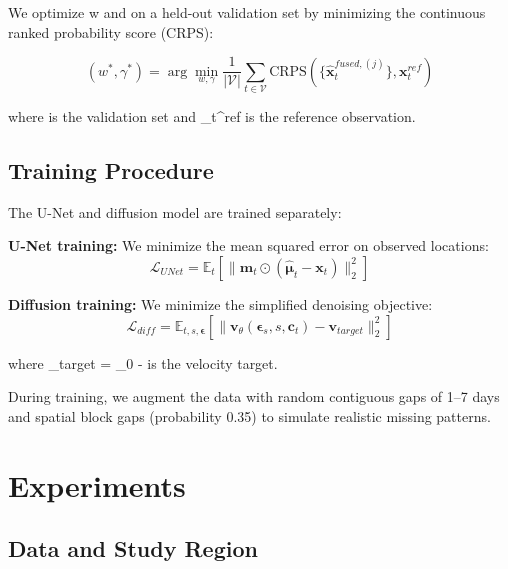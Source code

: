 \documentclass[preprint,12pt]{elsarticle}
\begin{document}
We optimize w and \gamma on a held-out validation set by minimizing the continuous ranked probability score (CRPS):

\begin{equation}
(w^*, \gamma^*) = \arg\min_{w, \gamma} \frac{1}{|\mathcal{V}|} \sum_{t \in \mathcal{V}} \text{CRPS}\left(\{\hat{\mathbf{x}}_t^{fused,(j)}\}, \mathbf{x}_t^{ref}\right)
\label{eq:calibration}
\end{equation}

where  is the validation set and _t^{ref} is the reference observation.

\subsection{Training Procedure}

The U-Net and diffusion model are trained separately:

\textbf{U-Net training:} We minimize the mean squared error on observed locations:
\begin{equation}
\mathcal{L}_{UNet} = \mathbb{E}_t\left[\|\mathbf{m}_t \odot (\hat{\boldsymbol{\mu}}_t - \mathbf{x}_t)\|_2^2\right]
\label{eq:loss_unet}
\end{equation}

\textbf{Diffusion training:} We minimize the simplified denoising objective:
\begin{equation}
\mathcal{L}_{diff} = \mathbb{E}_{t, s, \boldsymbol{\epsilon}}\left[\|\mathbf{v}_\theta(\boldsymbol{\epsilon}_s, s, \mathbf{c}_t) - \mathbf{v}_{target}\|_2^2\right]
\label{eq:loss_diff}
\end{equation}

where _{target} = \boldsymbol{\epsilon}_0 - \boldsymbol{\epsilon} is the velocity target.

During training, we augment the data with random contiguous gaps of 1--7 days and spatial block gaps (probability 0.35) to simulate realistic missing patterns.

\section{Experiments}
\label{sec:experiments}

\subsection{Data and Study Region}
\end{document}
